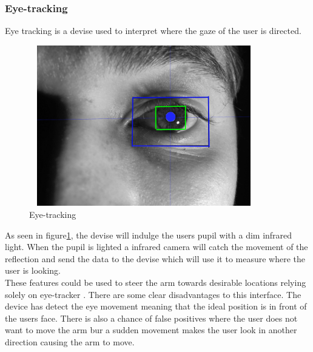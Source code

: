 \subsubsection*{Eye-tracking}
Eye tracking is a devise used to interpret where the gaze of the user is directed. 

\begin{figure}[H]
    \centering
    \includegraphics[width=10cm,height=7cm]{Figures/Contextual_figures/eye-tracking.png}
    \caption{Eye-tracking}
    \label{fig:Eye}
\end{figure}

As seen in figure\ref{fig:Eye}, the devise will indulge the users pupil with a dim infrared light. When the pupil is lighted a infrared camera will catch the movement of the reflection and send the data to the devise which will use it to measure where the user is looking.\\
These features could be used to steer the arm towards desirable locations relying solely on eye-tracker \cite{EyeTrack}. There are some clear disadvantages to this interface. The device has detect the eye movement meaning that the ideal position is in front of the users face. There is also a chance of false positives where the user does not want to move the arm bur a sudden movement makes the user look in another direction causing the arm to move. 

